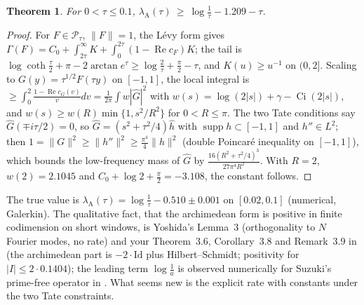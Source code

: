 \documentclass[11pt]{amsart}
\newtheorem{theorem}{Theorem}[section]
\theoremstyle{definition}
\theoremstyle{remark}
\newcommand{\Rel}{\operatorname{Re}}
\newcommand{\supp}{\operatorname{supp}}
\newcommand{\cF}{c_F}
\newcommand{\lamA}{\lambda_{\mathrm A}}
\begin{document}
\begin{theorem}\label{thm:A}
For $0<\tau\le0.1$, $\lamA(\tau)\ \ge\ \log\frac1\tau-1.209-\tau$.
\end{theorem}
\begin{proof}
For $F\in\mathcal P_\tau$, $\|F\|=1$, the L\'evy form gives $\Gamma(F)=C_0+\int_{2\tau}^\infty K+\int_0^{2\tau}(1-\Rel\cF)K$; the tail is
$\log\coth\frac\tau2+\pi-2\arctan e^\tau\ge\log\frac2\tau+\frac\pi2-\tau$, and $K(u)\ge u^{-1}$ on $(0,2]$. Scaling to
$G(y)=\tau^{1/2}F(\tau y)$ on $[-1,1]$, the local integral is $\ge\int_0^2\frac{1-\Rel c_G(v)}vdv=\frac1{2\pi}\int w|\widehat G|^2$ with
$w(s)=\log(2|s|)+\gamma-\operatorname{Ci}(2|s|)$, and $w(s)\ge w(R)\min\{1,s^2/R^2\}$ for $0<R\le\pi$. The two Tate conditions say
$\widehat G(\mp i\tau/2)=0$, so $\widehat G=(s^2+\tau^2/4)\widehat h$ with $\supp h\subset[-1,1]$ and $h''\in L^2$; then
$1=\|G\|^2\ge\|h''\|^2\ge\frac{\pi^4}4\|h\|^2$ (double Poincar\'e inequality on $[-1,1]$), which bounds the low-frequency mass of
$\widehat G$ by $\frac{16(R^2+\tau^2/4)^3}{27\pi^4R^2}$. With $R=2$, $w(2)=2.1045$ and $C_0+\log2+\frac\pi2=-3.108$, the
constant follows.
\end{proof}
The true value is $\lamA(\tau)=\log\frac1\tau-0.510\pm0.001$ on $[0.02,0.1]$ (numerical, Galerkin). The qualitative fact, that
the archimedean form is positive in finite codimension on short windows, is Yoshida's Lemma~3 \cite{Yoshida1992}
(orthogonality to $N$ Fourier modes, no rate) and your Theorem~3.6, Corollary~3.8 and Remark~3.9 in \cite{CC2021} (the archimedean part is
$-2\cdot\mathrm{Id}$ plus Hilbert--Schmidt; positivity for $|I|\le2\cdot0.1404$); the leading term $\log\frac1a$ is observed
numerically for Suzuki's prime-free operator in \cite{Kim2026}. What seems new is the explicit rate with constants under
the two Tate constraints.
\end{document}
